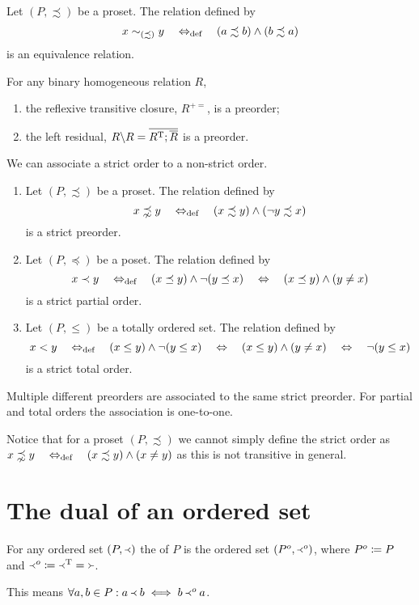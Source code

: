 \begin{lemma} \label{preorderEquivalence}
Let $(P, \precsim)$ be a proset. The relation defined by
\[ x \sim_{(\precsim)} y \quad\Leftrightarrow_{\text{def}}\quad (a\precsim b)\land (b\precsim a) \]
is an equivalence relation.
\end{lemma}

\begin{lemma}
For any binary homogeneous relation $R$,
\begin{enumerate}
\item the reflexive transitive closure, $R^{+=}$, is a preorder;
\item the left residual, $R\backslash R = \overline{R^{\mathrm{T}};\overline{R}}$ is a preorder.
\end{enumerate}
\end{lemma}

\begin{proposition}
We can associate a strict order to a non-strict order.
\begin{enumerate}
\item Let $(P, \precsim)$ be a proset. The relation defined by
\[ x\precnsim y \quad\Leftrightarrow_{\text{def}}\quad (x\precsim y)\land (\neg y\precsim x) \]
is a strict preorder.
\item Let $(P, \preceq)$ be a poset. The relation defined by
\[ x\prec y \quad\Leftrightarrow_{\text{def}}\quad (x\preceq y)\land \neg(y\preceq x) \quad \Leftrightarrow \quad (x\preceq y)\land (y\neq x) \]
is a strict partial order.
\item Let $(P, \leq)$ be a totally ordered set. The relation defined by
\[ x < y \quad\Leftrightarrow_{\text{def}}\quad (x\leq y)\land \neg(y\leq x) \quad \Leftrightarrow \quad (x\leq y)\land (y\neq x) \quad \Leftrightarrow \quad \neg(y\leq x)  \]
is a strict total order.
\end{enumerate}
Multiple different preorders are associated to the same strict preorder. For partial and total orders the association is one-to-one.
\end{proposition}
Notice that for a proset $(P, \precsim)$ we cannot simply define the strict order as $ x\precnsim y \quad\Leftrightarrow_{\text{def}}\quad (x\precsim y)\land (x\neq y)$ as this is not transitive in general.

\section{The dual of an ordered set}
\begin{definition}
For any ordered set $(P, \Yleft)$ the  of $P$ is the ordered set $(P^o, \Yleft^o)$, where $P^o \coloneqq P$ and $\Yleft^o \coloneqq \Yleft^{\mathrm{T}} = \Yright$.
\end{definition}
This means $\forall a,b\in P: a\Yleft b \iff b\Yleft^o a$.

